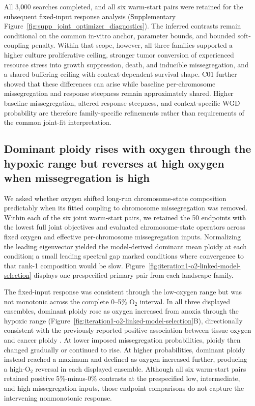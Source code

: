 \documentclass[11pt]{article}
\begin{document}
All 3,000 searches completed, and all six warm-start pairs were retained for the subsequent fixed-input response analysis (Supplementary Figure~\ref{fig:supp_joint_optimizer_diagnostics}). The inferred contrasts remain conditional on the common in-vitro anchor, parameter bounds, and bounded soft-coupling penalty. Within that scope, however, all three families supported a higher culture proliferative ceiling, stronger tumor conversion of experienced resource stress into growth suppression, death, and inducible missegregation, and a shared buffering ceiling with context-dependent survival shape. C01 further showed that these differences can arise while baseline per-chromosome missegregation and response steepness remain approximately shared. Higher baseline missegregation, altered response steepness, and context-specific WGD probability are therefore family-specific refinements rather than requirements of the common joint-fit interpretation.

\subsection*{Dominant ploidy rises with oxygen through the hypoxic range but reverses at high oxygen when missegregation is high}

We asked whether oxygen shifted long-run chromosome-state composition predictably when its fitted coupling to chromosome missegregation was removed. Within each of the six joint warm-start pairs, we retained the 50 endpoints with the lowest full joint objectives and evaluated chromosome-state operators across fixed oxygen and effective per-chromosome missegregation inputs. Normalizing the leading eigenvector yielded the model-derived dominant mean ploidy at each condition; a small leading spectral gap marked conditions where convergence to that rank-1 composition would be slow. Figure~\ref{fig:iteration1-o2-linked-model-selection} displays one prespecified primary pair from each landscape family.

The fixed-input response was consistent through the low-oxygen range but was not monotonic across the complete 0--5\% O$_2$ interval. In all three displayed ensembles, dominant ploidy rose as oxygen increased from anoxia through the hypoxic range (Figure~\ref{fig:iteration1-o2-linked-model-selection}B), directionally consistent with the previously reported positive association between tissue oxygen and cancer ploidy \cite{nowicka_interactions_2025}. At lower imposed missegregation probabilities, ploidy then changed gradually or continued to rise. At higher probabilities, dominant ploidy instead reached a maximum and declined as oxygen increased further, producing a high-O$_2$ reversal in each displayed ensemble. Although all six warm-start pairs retained positive 5\%-minus-0\% contrasts at the prespecified low, intermediate, and high missegregation inputs, those endpoint comparisons do not capture the intervening nonmonotonic response.
\end{document}
